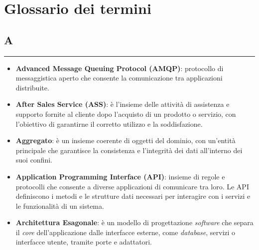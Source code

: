 \chapter{Glossario dei termini}
\newenvironment{glossaryitemize}
  {\begin{itemize}[label={}, leftmargin=*]}
  {\end{itemize}}

\section*{A}
{\color{lightgray}\rule{\textwidth}{0.4pt}} %
\begin{glossaryitemize}
    \item \textbf{Advanced Message Queuing Protocol (AMQP)}: protocollo di messaggistica aperto che consente la comunicazione tra applicazioni distribuite.
    \item \textbf{After Sales Service (ASS)}: è l'insieme delle attività di assistenza e supporto fornite al cliente dopo l'acquisto di un prodotto o servizio, con l'obiettivo di garantirne il corretto utilizzo e la soddisfazione.
    \item \textbf{Aggregato}: è un insieme coerente di oggetti del dominio, con un'entità principale che garantisce la consistenza e l'integrità dei dati all'interno dei suoi confini.
    \item \textbf{Application Programming Interface (API)}: insieme di regole e protocolli che consente a diverse applicazioni di comunicare tra loro. Le API definiscono i metodi e le strutture dati necessari per interagire con i servizi e le funzionalità di un sistema.
    \item \textbf{Architettura Esagonale}: è un modello di progettazione \textit{software} che separa il \textit{core} dell'applicazione dalle interfacce esterne, come \textit{database}, servizi o interfacce utente, tramite porte e adattatori.
\end{glossaryitemize}


